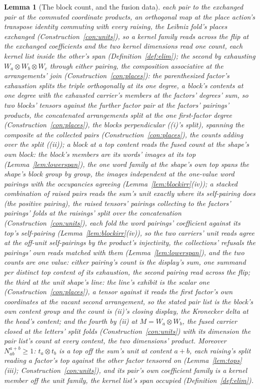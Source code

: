 \documentclass[11pt]{article}
\newtheorem{lemma}{Lemma}
\theoremstyle{definition}
\begin{document}
\begin{lemma}[The block count, and the fusion data]
each pair to the exchanged pair at the commuted coordinate
products, an orthogonal map at the place action's transpose
identity commuting with every raising, the Leibniz fold's places
exchanged (Construction~\ref{con:units}), so a kernel family reads
across the flip at the exchanged coefficients and the two kernel
dimensions read one count, each kernel list inside the other's
span (Definition~\ref{def:elim}); the second by exhausting
$W_a\otimes W_b\otimes W_c$ through either pairing, the
composition associative at the arrangements' join
(Construction~\ref{con:places}): the parenthesized factor's
exhaustion splits the triple orthogonally at its one degree, a
block's contents at one degree with the exhausted carrier's
members at the factors' degrees' sum, so two blocks' tensors
against the further factor pair at the factors' pairings'
products, the concatenated arrangements split at the one
first-factor degree (Construction~\ref{con:places}), the blocks
perpendicular ((i)'s split), spanning the composite at the
collected pairs (Construction~\ref{con:places}), the counts
adding over the split ((ii)); a block at a top content
reads the fused count at the shape's own block: the block's
members are its words' images at its top
(Lemma~\ref{lem:lowerspan}), the one word family at the shape's
own top spans the shape's block group by group, the images
independent at the one-value word pairings with the occupancies
agreeing (Lemma~\ref{lem:blockirr}(iv)); a stacked combination of
raised pairs reads the sum's unit exactly where its self-pairing
does (the positive pairing), the raised tensors' pairings
collecting to the factors' pairings' folds at the raisings' split
over the concatenation (Construction~\ref{con:units}), each fold
the word pairings' coefficient against its top's self-pairing
(Lemma~\ref{lem:blockirr}(iv)), so the two carriers' unit reads
agree at the off-unit self-pairings by the product's injectivity,
the collections' refusals the pairings' own reads matched with
them (Lemma~\ref{lem:lowerspan}), and the two counts are one
value: either pairing's count is the display's sum, one summand
per distinct top content of its exhaustion, the second pairing
read across the flip; the third at the unit shape's line: the
line's exhibit is the scalar one (Construction~\ref{con:places}),
a tensor against it reads the first factor's own coordinates at
the vacant second arrangement, so the stated pair list is the
block's own content group and the count is (ii)'s closing
display, the Kronecker delta at the head's content; and the
fourth by (ii) at $M=W_a\otimes W_b$, the fused carrier closed at
the letters' split folds (Construction~\ref{con:units}) with its
dimension the pair list's count at every content, the two
dimensions' product.
Moreover $N^{a+b}_{ab}\ge1$: $t_a\otimes t_b$ is a top off the
sum's unit at content $a+b$, each raising's split reading a
factor's top against the other factor tensored on
(Lemma~\ref{lem:tops}(iii); Construction~\ref{con:units}), and its
pair's own coefficient family is a kernel member off the unit
family, the kernel list's span occupied
(Definition~\ref{def:elim}).
\end{lemma}
\end{document}
